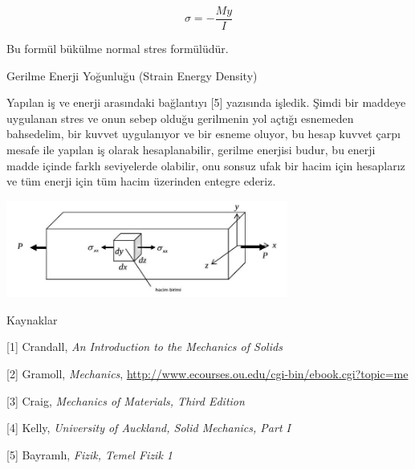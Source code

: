 \documentclass[12pt,fleqn]{article}\usepackage{../../common}
\begin{document}
$$
\sigma = - \frac{M y}{I}
$$

Bu formül bükülme normal stres formülüdür.

Gerilme Enerji Yoğunluğu (Strain Energy Density)

Yapılan iş ve enerji arasındaki bağlantıyı [5] yazısında işledik. Şimdi
bir maddeye uygulanan stres ve onun sebep olduğu gerilmenin yol açtığı
esnemeden bahsedelim, bir kuvvet uygulanıyor ve bir esneme oluyor, bu
hesap kuvvet çarpı mesafe ile yapılan iş olarak hesaplanabilir, gerilme
enerjisi budur, bu enerji madde içinde farklı seviyelerde olabilir,
onu sonsuz ufak bir hacim için hesaplarız ve tüm enerji için tüm
hacim üzerinden entegre ederiz.

\includegraphics[width=25em]{phy_020_strs_00_06.jpg}


Kaynaklar

[1] Crandall, {\em An Introduction to the Mechanics of Solids}

[2] Gramoll, {\em Mechanics},
    \url{http://www.ecourses.ou.edu/cgi-bin/ebook.cgi?topic=me}

[3] Craig, {\em Mechanics of Materials, Third Edition}

[4] Kelly, {\em University of Auckland, Solid Mechanics, Part I}

[5] Bayramlı, {\em Fizik, Temel Fizik 1}
    
\end{document}

